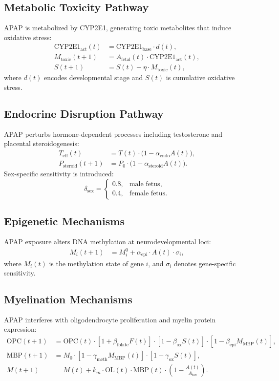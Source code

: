 \documentclass[12pt]{article}
\begin{document}
\subsection{Metabolic Toxicity Pathway}
APAP is metabolized by CYP2E1, generating toxic metabolites that induce oxidative stress:
\begin{align}
\text{CYP2E1}_{\text{act}}(t) &= \text{CYP2E1}_{\text{base}} \cdot d(t), \\
M_{\text{toxic}}(t+1) &= A_{\text{fetal}}(t) \cdot \text{CYP2E1}_{\text{act}}(t), \\
S(t+1) &= S(t) + \eta \cdot M_{\text{toxic}}(t),
\end{align}
where $d(t)$ encodes developmental stage and $S(t)$ is cumulative oxidative stress.

\subsection{Endocrine Disruption Pathway}
APAP perturbs hormone-dependent processes including testosterone and placental steroidogenesis:
\begin{align}
T_{\text{eff}}(t) &= T(t) \cdot \big(1 - \alpha_{\text{endo}} A(t)\big), \\
P_{\text{steroid}}(t+1) &= P_{0} \cdot \big(1 - \alpha_{\text{steroid}} A(t)\big).
\end{align}
Sex-specific sensitivity is introduced:
\[
\delta_{\text{sex}} =
\begin{cases}
0.8, & \text{male fetus}, \\
0.4, & \text{female fetus}.
\end{cases}
\]

\subsection{Epigenetic Mechanisms}
APAP exposure alters DNA methylation at neurodevelopmental loci:
\begin{align}
M_{i}(t+1) &= M_{i}^{0} + \alpha_{\text{epi}} \cdot A(t) \cdot \sigma_{i},
\end{align}
where $M_{i}(t)$ is the methylation state of gene $i$, and $\sigma_{i}$ denotes gene-specific sensitivity.

\subsection{Myelination Mechanisms}
APAP interferes with oligodendrocyte proliferation and myelin protein expression:
\begin{align}
\text{OPC}(t+1) &= \text{OPC}(t) \cdot \left[1 + \beta_{\text{folate}} F(t)\right]
                                \cdot \left[1 - \beta_{\text{ox}} S(t)\right]
                                \cdot \left[1 - \beta_{\text{epi}} M_{\text{MBP}}(t)\right], \\
\text{MBP}(t+1) &= M_{0} \cdot \left[1 - \gamma_{\text{meth}} M_{\text{MBP}}(t)\right]
                          \cdot \left[1 - \gamma_{\text{ox}} S(t)\right], \\
M(t+1) &= M(t) + k_{m} \cdot \text{OL}(t) \cdot \text{MBP}(t) 
                 \cdot \left(1 - \frac{A(t)}{A_{\text{tox}}}\right).
\end{align}
\end{document}
